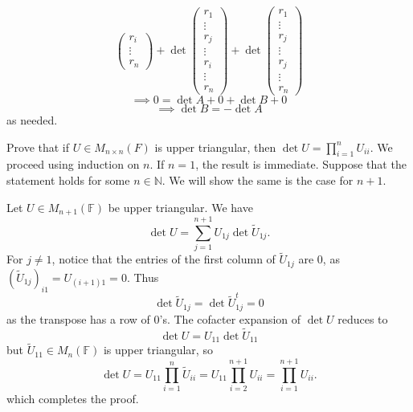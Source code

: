 \documentclass{eh-homework}
\begin{document}
\begin{question}{4}
\[\begin{pmatrix}
            r_i \\
            \vdots \\
            r_n
        \end{pmatrix}+
        \det \begin{pmatrix}
            r_1 \\
            \vdots \\
            r_j\\
            \vdots \\
            r_i \\
            \vdots \\
            r_n
       \end{pmatrix}+
       \det \begin{pmatrix}
            r_1 \\
            \vdots \\
            r_j\\
            \vdots \\
            r_j \\
            \vdots \\
            r_n
        \end{pmatrix}
    \]
    \[
        \implies 0 = \det A + 0 + \det B + 0
    \]
    \[
        \implies \det B = -\det A
    \]
    as needed.
    \end{question}
    
    \begin{question}{5}
    Prove that if $U \in M_{n \times n}(F)$ is upper triangular, then $\det U = \prod_{i=1}^n U_{ii}$.
    \tcblower
    We proceed using induction on \(n\). If \(n=1\), the result is immediate. Suppose that the statement holds for some \(n \in \mathbb{N}\). We will show the same is the case for \(n + 1\).

    Let \(U \in M_{n+1} (\mathbb{F})\) be upper triangular. We have
    \[
        \det U = \sum_{j=1}^{n+1} U_{1j} \det \tilde{U}_{1j}.
    \]
    For \(j \neq 1\), notice that the entries of the first column of \(\tilde{U}_{1j}\) are 0, as \((\tilde{U}_{1j})_{i1} = U_{(i+1)1} = 0\). Thus
    \[
        \det \tilde{U}_{1j} = \det \tilde{U}_{1j}^t = 0
    \]
    as the transpose has a row of 0's. The cofacter expansion of \(\det U\) reduces to
    \[
        \det U = U_{11} \det \tilde{U}_{11}
    \]
    but \(\tilde{U}_{11} \in M_n(\mathbb{F})\) is upper triangular, so
    \[
        \det U = U_{11} \prod _{i=1}^n \tilde{U}_{ii} = U_{11} \prod _{i=2}^{n+1} U_{ii} = \prod _{i=1}^{n+1} U_{ii}. 
    \]
    which completes the proof.
    \end{question}
    
\end{document}
